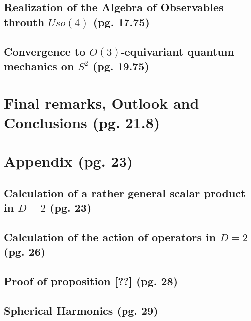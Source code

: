 \documentclass{article}
\begin{document}
\subsection{Realization of the Algebra of Observables throuth $Uso(4)$ (pg. 17.75)}

\subsection{Convergence to $O(3)$-equivariant quantum mechanics on $S^2$ (pg. 19.75)}

\section{Final remarks, Outlook and Conclusions (pg. 21.8)}

\section{Appendix (pg. 23)}

\subsection{Calculation of a rather general scalar product in $D=2$ (pg. 23)}

\subsection{Calculation of the action of operators in $D=2$ (pg. 26)}

\subsection{Proof of proposition [??] (pg. 28)}

\subsection{Spherical Harmonics (pg. 29)}
\end{document}
